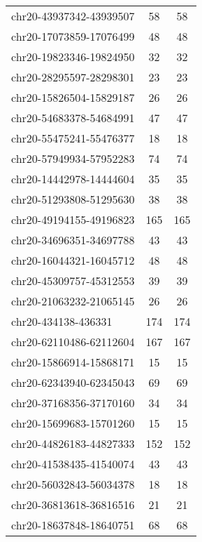 \documentclass[10pt,letterpaper]{article}
\begin{document}
{\begin{longtable}{lSS}
	chr20-43937342-43939507 & 58     & 58                    \\
	chr20-17073859-17076499 & 48     & 48                    \\
	chr20-19823346-19824950 & 32     & 32                    \\
	chr20-28295597-28298301 & 23     & 23                    \\
	chr20-15826504-15829187 & 26     & 26                    \\
	chr20-54683378-54684991 & 47     & 47                    \\
	chr20-55475241-55476377 & 18     & 18                    \\
	chr20-57949934-57952283 & 74     & 74                    \\
	chr20-14442978-14444604 & 35     & 35                    \\
	chr20-51293808-51295630 & 38     & 38                    \\
	chr20-49194155-49196823 & 165    & 165                   \\
	chr20-34696351-34697788 & 43     & 43                    \\
	chr20-16044321-16045712 & 48     & 48                    \\
	chr20-45309757-45312553 & 39     & 39                    \\
	chr20-21063232-21065145 & 26     & 26                    \\
	chr20-434138-436331     & 174    & 174                   \\
	chr20-62110486-62112604 & 167    & 167                   \\
	chr20-15866914-15868171 & 15     & 15                    \\
	chr20-62343940-62345043 & 69     & 69                    \\
	chr20-37168356-37170160 & 34     & 34                    \\
	chr20-15699683-15701260 & 15     & 15                    \\
	chr20-44826183-44827333 & 152    & 152                   \\
	chr20-41538435-41540074 & 43     & 43                    \\
	chr20-56032843-56034378 & 18     & 18                    \\
	chr20-36813618-36816516 & 21     & 21                    \\
	chr20-18637848-18640751 & 68     & 68                    \\

\end{longtable}}
\end{document}
